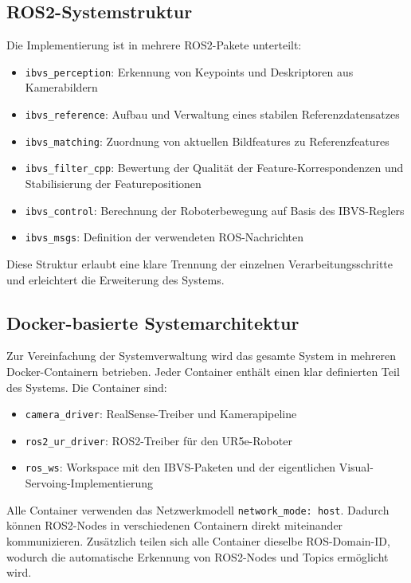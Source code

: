 \subsection{ROS2-Systemstruktur}
\label{subsec:ros2_systemstruktur}

Die Implementierung ist in mehrere \ac{ROS2}-Pakete unterteilt:

\begin{itemize}
	\item \texttt{ibvs\_perception}: Erkennung von Keypoints und Deskriptoren aus Kamerabildern
	\item \texttt{ibvs\_reference}: Aufbau und Verwaltung eines stabilen Referenzdatensatzes
	\item \texttt{ibvs\_matching}: Zuordnung von aktuellen Bildfeatures zu Referenzfeatures
	\item \texttt{ibvs\_filter_cpp}: Bewertung der Qualität der Feature-Korrespondenzen und Stabilisierung der Featurepositionen
	\item \texttt{ibvs\_control}: Berechnung der Roboterbewegung auf Basis des IBVS-Reglers
	\item \texttt{ibvs\_msgs}: Definition der verwendeten ROS-Nachrichten
\end{itemize}

Diese Struktur erlaubt eine klare Trennung der einzelnen Verarbeitungsschritte und erleichtert die Erweiterung des Systems.

\subsection{Docker-basierte Systemarchitektur}
\label{subsec:docker_architektur}

Zur Vereinfachung der Systemverwaltung wird das gesamte System in mehreren Docker-Containern betrieben. Jeder Container enthält einen klar definierten Teil des Systems. Die Container sind:

\begin{itemize}
	\item \texttt{camera\_driver}: RealSense-Treiber und Kamerapipeline
	\item \texttt{ros2\_ur\_driver}: \ac{ROS2}-Treiber für den UR5e-Roboter
	\item \texttt{ros\_ws}: Workspace mit den IBVS-Paketen und der eigentlichen Visual-Servoing-Implementierung
\end{itemize}

Alle Container verwenden das Netzwerkmodell \texttt{network\_mode: host}. Dadurch können \ac{ROS2}-Nodes in verschiedenen Containern direkt miteinander kommunizieren. Zusätzlich teilen sich alle Container dieselbe ROS-Domain-ID, wodurch die automatische Erkennung von \ac{ROS2}-Nodes und Topics ermöglicht wird.

